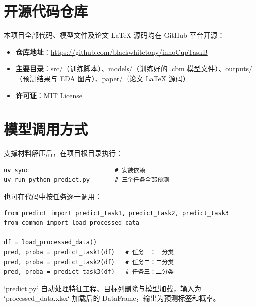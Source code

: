 \section{开源代码仓库}

本项目全部代码、模型文件及论文 LaTeX 源码均在 GitHub 平台开源：

\begin{itemize}[itemsep=2pt]
\item \textbf{仓库地址}：\url{https://github.com/blackwhitetony/innoCupTaskB}
\item \textbf{主要目录}：src/（训练脚本）、models/（训练好的 .cbm 模型文件）、outputs/（预测结果与 EDA 图片）、paper/（论文 LaTeX 源码）
\item \textbf{许可证}：MIT License
\end{itemize}

\section{模型调用方式}

支撑材料解压后，在项目根目录执行：

\begin{verbatim}
uv sync                        # 安装依赖
uv run python predict.py       # 三个任务全部预测
\end{verbatim}

也可在代码中按任务逐一调用：

\begin{verbatim}
from predict import predict_task1, predict_task2, predict_task3
from common import load_processed_data

df = load_processed_data()
pred, proba = predict_task1(df)   # 任务一：三分类
pred, proba = predict_task2(df)   # 任务二：二分类
pred, proba = predict_task3(df)   # 任务三：二分类
\end{verbatim}

`predict.py` 自动处理特征工程、目标列删除与模型加载，输入为 `processed\_data.xlsx` 加载后的 DataFrame，输出为预测标签和概率。
